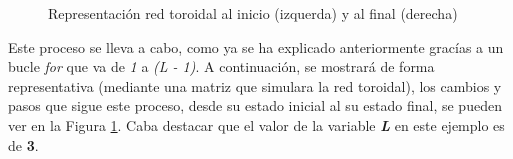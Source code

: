 \documentclass[11pt]{article}
\begin{document}
\begin{figure}[H]
  \centering
  \caption{Representación red toroidal al inicio (izquerda) y al final (derecha)}
  \label{fig:toroide}
\end{figure}

Este proceso se lleva a cabo, como ya se ha explicado anteriormente gracías a un bucle \textit{for} que va de \textit{1} a \textit{(L - 1)}. A continuación, se mostrará de forma representativa (mediante una matriz que simulara la red toroidal), los cambios y pasos que sigue este proceso, desde su estado inicial al su estado final, se pueden ver en la Figura \ref{fig:toroide}. Caba destacar que el valor de la variable \textbf{\textit{L}} en este ejemplo es de \textbf{3}.
\end{document}
